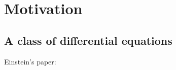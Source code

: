 \chapter{Motivation}


\section{A class of differential equations}

Einstein's paper: \cite{Einstein}
